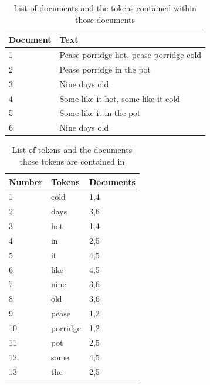 \documentclass{article}
\begin{document}
\begin{table}
	\centering
	\begin{tabular}{|l|l|}
		\hline
		\textbf{Document} & \textbf{Text} \\
		\hline		
		1 & Pease porridge hot, pease porridge cold \\
		2 & Pease porridge in the pot \\
		3 & Nine days old \\
		4 & Some like it hot, some like it cold \\
		5 & Some like it in the pot \\
		6 & Nine days old \\
		\hline				
	\end{tabular}
	\caption{List of documents and the tokens contained within those documents}
	\label{tab:doc-word}
\end{table}

\begin{table}
	\centering
	\begin{tabular}{|l|l|l|}
		\hline
		\textbf{Number} & \textbf{Tokens} & \textbf{Documents} \\
		\hline
		1 & cold & 1,4 \\
		2 & days & 3,6 \\
		3 & hot & 1,4 \\
		4 & in & 2,5 \\
		5 & it & 4,5 \\
		6 & like & 4,5 \\
		7 & nine & 3,6 \\
		8 & old & 3,6 \\
		9 & pease & 1,2 \\
		10 & porridge & 1,2 \\		
		11 & pot & 2,5 \\
		12 & some & 4,5 \\
		13 & the & 2,5 \\		
		\hline
	\end{tabular}
	\caption{List of tokens and the documents those tokens are contained in}
	\label{tab:word-doc}
\end{table}
\end{document}
